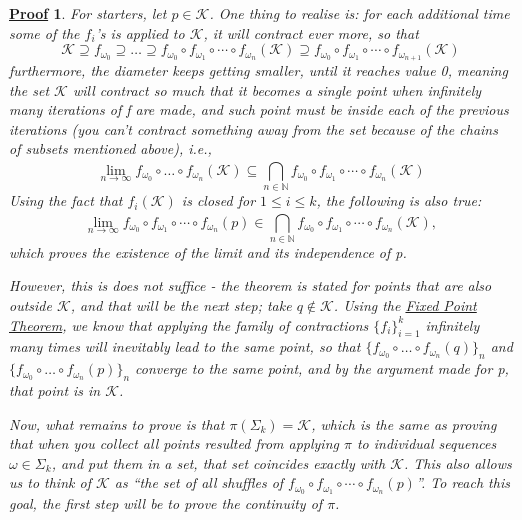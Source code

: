\documentclass{article}
\newtheorem*{proof*}{\underline{Proof}}
\begin{document}
\begin{proof*}
	For starters, let \(p\in \mathcal{K}\). One thing to realise is: for each additional time some of the \(f_{i}\)'s is applied to \(\mathcal{K}\), it will contract ever more, so that
	\[
		\mathcal{K}\supseteq f_{\omega_{0}}\supseteq \dotsc \supseteq f_{\omega_{0}}\circ f_{\omega_{1}}\circ\cdots\circ f_{\omega_{n}}(\mathcal{K}) \supseteq f_{\omega_{0}}\circ f_{\omega_{1}}\circ\cdots\circ f_{\omega_{n+1}}(\mathcal{K})
	\]
	furthermore, the diameter keeps getting smaller, until it reaches value 0, meaning the set \(\mathcal{K}\) will contract so much that it becomes a single point
	when infinitely many iterations of f are made, and such point must be inside each of the previous iterations (you can't contract something away from the set because
	of the chains of subsets mentioned above), i.e.,
	\[
		\lim_{n\to \infty}f_{\omega_{0}}\circ \dotsc \circ f_{\omega_{n}}(\mathcal{K}) \subseteq \bigcap_{n\in \mathbb{N}}^{}f_{\omega_{0}}\circ f_{\omega_{1}}\circ\cdots\circ f_{\omega_{n}} (\mathcal{K})
	\]
	Using the fact that \(f_{i}(\mathcal{K})\) is closed for \(1\leq i\leq k\), the following is also true:
	\[
		\lim_{n\to \infty} f_{\omega_{0}}\circ f_{\omega_{1}}\circ\cdots\circ f_{\omega_{n}}(p)\in \bigcap_{n\in \mathbb{N}}^{}f_{\omega_{0}}\circ f_{\omega_{1}}\circ\cdots\circ f_{\omega_{n}} (\mathcal{K}),
	\]
	which proves the existence of the limit and its independence of p.

	However, this is does not suffice - the theorem is stated for points that are also outside \(\mathcal{K}\), and that will be the next step; take \(q\not\in \mathcal{K}\). Using the \hyperlink{fixed_point_theorem}{\textit{Fixed Point Theorem}},
	we know that applying the family of contractions \(\{f_{i}\}_{i=1}^{k}\) infinitely many times will inevitably lead to the same point, so that \(\{f_{\omega_{0}}\circ \dotsc \circ f_{\omega_{n}}(q)\}_{n}\) and \(\{f_{\omega_{0}}\circ \dotsc \circ
	f_{\omega_{n}}(p)\}_{n}\) converge to the same point, and by the argument made for p, that point is in \(\mathcal{K}\).

	Now, what remains to prove is that \(\pi(\Sigma_{k})=\mathcal{K} \), which is the same as proving that when you collect all points resulted from applying \(\pi\) to individual sequences \(\omega\in \Sigma_{k}\), and put them in a set,
	that set coincides exactly with \(\mathcal{K}\). This also allows us to think of \(\mathcal{K}\) as ``the set of all shuffles of \(f_{\omega_{0}}\circ f_{\omega_{1}}\circ\cdots\circ f_{\omega_{n}}(p)\)''. To reach this goal, the first step
	will be to prove the continuity of \(\pi \).


\end{proof*}
\end{document}
